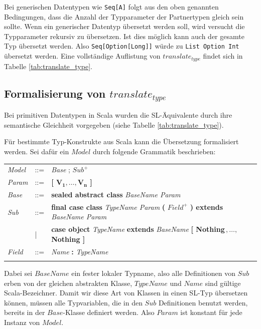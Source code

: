 \documentclass[12pt,bibtotoc]{scrreprt}
\begin{document}
Bei generischen Datentypen wie \lstinline!Seq[A]! folgt aus den oben genannten Bedingungen, dass die Anzahl der Typparameter der Partnertypen gleich sein sollte. Wenn ein generischer Datentyp übersetzt werden soll, wird versucht die Typparameter rekursiv zu übersetzen. Ist dies möglich kann auch der gesamte Typ übersetzt werden. Also \lstinline!Seq[Option[Long]]! würde zu \lstinline!List Option Int! übersetzt werden. Eine vollständige Auflistung von $translate_{type}$ findet sich in Tabelle \ref{tab:translate_type}.

\subsection{Formalisierung von $translate_{type}$}
\label{subsec:formal-translate-typ}

Bei primitiven Datentypen in Scala wurden die SL-Äquivalente durch ihre semantische Gleichheit vorgegeben (siehe Tabelle \ref{tab:translate_type}). 

Für bestimmte Typ-Konstrukte aus Scala kann die Übersetzung formalisiert werden. Sei dafür ein $Model$ durch folgende Grammatik beschrieben:

\begin{tabular}{lll}
\emph{Model} & ::= & \emph{Base} ; \emph{$Sub^+$}\\
\emph{Param} & ::= & \textbf{[ $\mathbf{V_1, \dots ,V_n}$ ]}\\
\emph{Base}  & ::= & \textbf{sealed abstract class} \emph{BaseName Param}\\
\emph{Sub}   & ::=   & \textbf{final case class} \emph{TypeName Param} \textbf{(} $Field^+$ \textbf{) extends} \emph{BaseName Param}\\
 & | & \textbf{case object} \emph{TypeName} \textbf{extends} \emph{BaseName} \textbf{[ Nothing$\,,\dots,\,$Nothing ]}\\
\emph{Field} & ::= & \emph{Name} \textbf{:} \emph{TypeName}\\
\\
\end{tabular}

Dabei sei $BaseName$ ein fester lokaler Typname, also alle Definitionen von $Sub$ erben von der gleichen abstrakten Klasse, $TypeName$ und $Name$ sind gültige Scala-Bezeichner. Damit wir diese Art von Klassen in einen SL-Typ übersetzen können, müssen alle Typvariablen, die in den $Sub$ Definitionen benutzt werden, bereits in der $Base$-Klasse definiert werden. Also $Param$ ist konstant für jede Instanz von $Model$.
\end{document}
